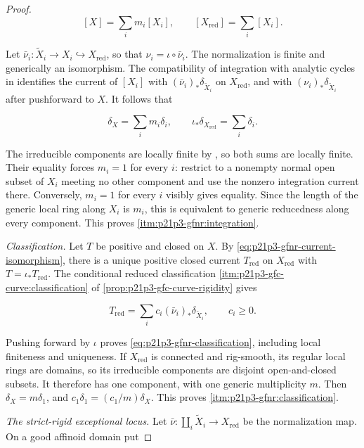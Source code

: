 \begin{proof}
\[
                 [X]=\sum_i m_i[X_i],
                 \qquad
                 [X_{\mathrm{red}}]=\sum_i[X_i].
\]

Let
\(\bar\nu_i:\widetilde X_i\to X_i\hookrightarrow X_{\mathrm{red}}\),
so that \(\nu_i=\iota\circ\bar\nu_i\).  The normalization is finite and
generically an isomorphism.  The compatibility of integration with analytic
cycles in \cite[Proposition~16.6.3]{CLD25} identifies the current of
\([X_i]\) with
\((\bar\nu_i)_*\delta_{\widetilde X_i}\) on \(X_{\mathrm{red}}\), and
with \((\nu_i)_*\delta_{\widetilde X_i}\) after pushforward to \(X\).
It follows that

\[
 \delta_X=\sum_i m_i\delta_i,
 \qquad
 \iota_*\delta_{X_{\mathrm{red}}}=\sum_i\delta_i.
\]

The irreducible components are locally finite by
\cite[\S11.2.5]{CLD25}, so both sums are locally finite.  Their equality
forces \(m_i=1\) for every \(i\): restrict to a nonempty normal open subset
of \(X_i\) meeting no other component and use the nonzero integration
current there.  Conversely, \(m_i=1\) for every \(i\) visibly gives
equality.  Since the length of the generic local ring along \(X_i\) is
\(m_i\), this is equivalent to generic reducedness along every component.
This proves \cref{itm:p21p3-gfnr:integration}.

\smallskip
\emph{Classification.}
Let \(T\) be positive and closed on \(X\).  By
\eqref{eq:p21p3-gfnr-current-isomorphism}, there is a unique positive
closed current \(T_{\mathrm{red}}\) on \(X_{\mathrm{red}}\) with
\(T=\iota_*T_{\mathrm{red}}\).  The conditional reduced classification
\cref{itm:p21p3-gfc-curve:classification} of
\cref{prop:p21p3-gfc-curve-rigidity} gives

\[
                  T_{\mathrm{red}}=\sum_i c_i
                    (\bar\nu_i)_*\delta_{\widetilde X_i},
                  \qquad c_i\geq0.
\]

Pushing forward by \(\iota\) proves
\eqref{eq:p21p3-gfnr-classification}, including local finiteness and
uniqueness.  If \(X_{\mathrm{red}}\) is connected and rig-smooth, its
regular local rings are domains, so its irreducible components are
disjoint open-and-closed subsets.  It therefore has one component, with
one generic multiplicity \(m\).  Then
\(\delta_X=m\delta_1\), and
\(c_1\delta_1=(c_1/m)\delta_X\).  This proves
\cref{itm:p21p3-gfnr:classification}.

\smallskip
\emph{The strict-rigid exceptional locus.}
Let
\(\bar\nu:\coprod_i\widetilde X_i\to X_{\mathrm{red}}\) be the
normalization map.  On a good affinoid domain put


\end{proof}
